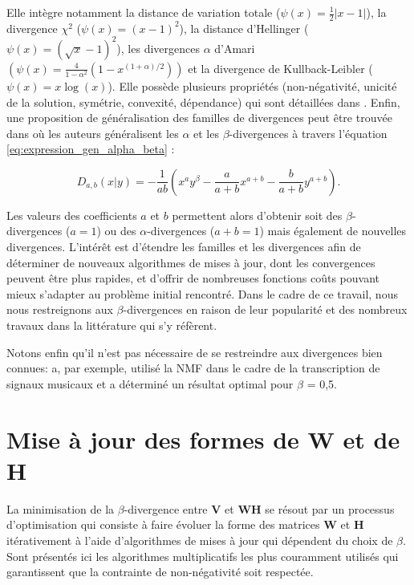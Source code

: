 Elle intègre notamment la distance de variation totale ($\psi(x) = \frac{1}{2}\vert x-1 \vert $), la divergence $\chi^2$ ($\psi(x) = (x-1)^2$), la distance d'Hellinger ($\psi(x) = (\sqrt{x}-1)^2$), les divergences $\alpha$ d'Amari $(\psi(x) = \frac{4}{1-\alpha^2} \left(1-x^{(1+\alpha)/2} \right))$ et la divergence de Kullback-Leibler ($\psi(x) = x\log (x)$). Elle possède plusieurs propriétés (non-négativité, unicité de la solution, symétrie, convexité, dépendance) qui sont détaillées dans \cite{csiszar2004information}.
Enfin, une proposition de généralisation des familles de divergences peut être trouvée dans \cite{cichocki_generalized_2011} où les auteurs généralisent les $\alpha$ et les $\beta$-divergences à travers l'équation  \ref{eq:expression_gen_alpha_beta} :

\begin{equation}\label{eq:expression_gen_alpha_beta}
D_{a, b}(x \vert y) = -\frac{1}{a b}\left(x^{a}y^{\beta}- \frac{a}{a+b}x^{a + b}-\frac{b}{a+b}y^{a+b} \right).
\end{equation}

Les valeurs des coefficients $a$ et $b$ permettent alors d'obtenir soit des $\beta$-divergences ($a = 1$) ou des $\alpha$-divergences ($a+b = 1$) mais également de nouvelles divergences. L'intérêt est d'étendre les familles et les divergences afin de déterminer de nouveaux algorithmes de mises à jour, dont les convergences peuvent être plus rapides, et d'offrir de nombreuses fonctions coûts pouvant mieux s'adapter au problème initial rencontré. Dans le cadre de ce travail, nous nous restreignons aux $\beta$-divergences en raison de leur popularité et des nombreux travaux dans la littérature qui s'y réfèrent.

Notons enfin qu'il n'est pas nécessaire de se restreindre aux divergences bien connues:  \cite{vincent2010adaptive} a, par exemple,  utilisé la NMF dans le cadre de la transcription de signaux musicaux et a déterminé un résultat optimal pour $\beta$ = 0,5. \\

\section{Mise à jour des formes de \textbf{W} et de \textbf{H}}

La minimisation de la $\beta$-divergence entre $\mathbf{V}$ et $\mathbf{WH}$ se résout par un processus d'optimisation qui consiste à faire évoluer la forme des matrices $\mathbf{W}$ et $\mathbf{H}$ itérativement à l'aide d'algorithmes de mises à jour qui dépendent du choix de $\beta$.
Sont présentés ici les algorithmes multiplicatifs les plus couramment utilisés qui garantissent que la contrainte de non-négativité soit respectée.

